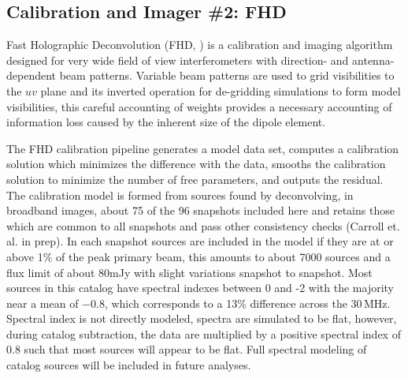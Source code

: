 \documentclass[twolcolumn]{emulateapj}
\begin{document}
\subsection{Calibration and Imager \#2: FHD}
\label{sec:FHD}
Fast Holographic Deconvolution (FHD, \cite{Sullivan:2012p9457}) is a calibration and imaging algorithm designed for very wide field of view interferometers with direction- and antenna-dependent beam patterns. Variable beam patterns are used to grid visibilities to the $uv$ plane and its inverted operation for de-gridding simulations to form model visibilities, this careful accounting of weights provides a necessary accounting of information loss caused by the inherent size of the dipole element.

The FHD calibration pipeline generates a model data set, computes a calibration solution which minimizes the difference with the data, smooths the calibration solution to minimize the number of free parameters, and outputs the residual. The calibration model is formed from sources found by deconvolving, in broadband images, about 75 of the 96 snapshots included here and retains those which are common to all snapshots and pass other consistency checks (Carroll et. al. in prep). In each snapshot sources are included in the model if they are at or above 1\% of the peak primary beam, this amounts to about 7000 sources and a flux limit of about 80mJy with slight variations snapshot to snapshot. Most sources in this catalog have spectral indexes between 0 and -2 with the majority near a mean of $-0.8$, which corresponds to a 13\% difference across the 30\,MHz.  Spectral index is not directly modeled, spectra are simulated to be flat, however, during catalog subtraction, the data are multiplied by a positive spectral index of 0.8 such that most sources will appear to be flat. Full spectral modeling of catalog sources will be included in future analyses.
\end{document}
